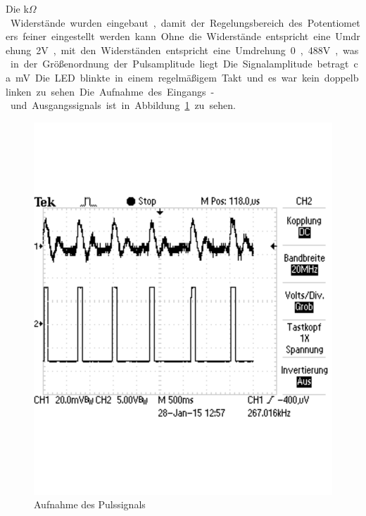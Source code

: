 \documentclass[12pt,a4paper]{article}
\begin{document}
Die \unit[20]{k$\Omega$} Widerstände wurden eingebaut, damit der Regelungsbereich des Potentiometers feiner eingestellt werden kann. Ohne die Widerstände entspricht eine Umdrehung 2V, mit den Widerständen entspricht eine Umdrehung 0,488V, was in der Größenordnung der Pulsamplitude liegt. Die Signalamplitude betragt ca. \unit[40]{mV}. Die LED blinkte in einem regelmäßigem Takt und es war kein doppelblinken zu sehen. Die Aufnahme des Eingangs- und Ausgangssignals ist in Abbildung \ref{fig:5_1} zu sehen.

\begin{figure}[H] 
	\centering
	\includegraphics[trim = 0mm 50mm 0mm 50mm, clip, scale = 0.4]{5_1.pdf}
	\caption[Aufnahme des Pulssignals]{Aufnahme des Pulssignals}
	\label{fig:5_1}
\end{figure}
\end{document}
